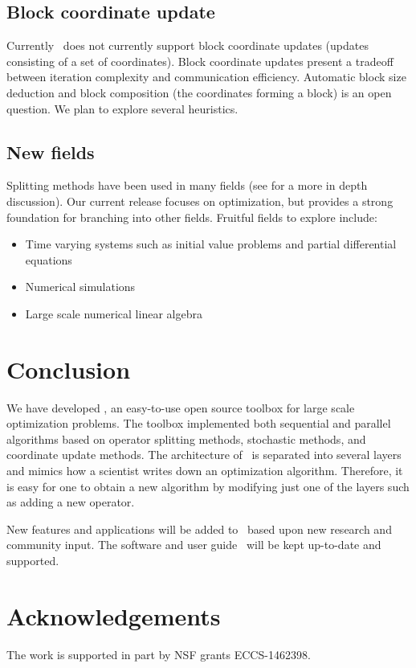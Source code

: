 \subsection{Block coordinate update}
  Currently \pkg~does not currently support block coordinate updates (updates consisting of a set of coordinates). Block coordinate updates present a tradeoff between iteration complexity and communication efficiency.
  Automatic block size deduction and block composition (the coordinates forming a block) is an open question.
We plan to explore several heuristics.

\subsection{New fields}

Splitting methods have been used in many fields (see \citep{roland2016some} for a more in depth discussion).
Our current release focuses on optimization, but provides a strong foundation for branching into other fields.
Fruitful fields to explore include:

\begin{itemize}
\item Time varying systems such as initial value problems and partial differential equations
\item Numerical simulations
\item Large scale numerical linear algebra 
\end{itemize}


\section{Conclusion }
We have developed \pkg, an easy-to-use open source toolbox for large scale optimization problems.
The toolbox implemented both sequential and parallel algorithms based on operator splitting methods, stochastic methods,
and coordinate update methods. The architecture of \pkg~is separated into several layers and mimics how a scientist writes down an optimization algorithm. Therefore, it is easy for one to obtain a new algorithm by modifying just one of the layers such as adding a new operator.


New features and applications will be added to \pkg~based upon new research and community input. The software and user guide \repo~will be kept up-to-date and supported.

\section{Acknowledgements}
The work is supported in part by NSF grants ECCS-1462398.
